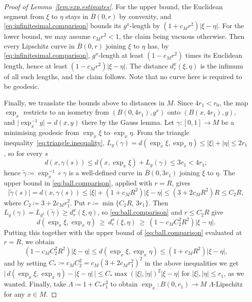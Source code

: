 \documentclass[11pt,reqno]{amsart}
\theoremstyle{plain}
\theoremstyle{definition}
\begin{document}
\begin{proof}[Proof of Lemma~\ref{lem:exp.estimates}]
    For the upper bound, the Euclidean segment from \( \xi \) to \( \eta \) stays in \( \overline B(0,r) \) by convexity, and \eqref{eq:infinitesimal.comparison} bounds its \( g^x \)-length by \( (1+c_Mr^2)\lvert\xi-\eta\rvert \). 
    For the lower bound, we may assume \( c_Mr^2<1 \), the claim being vacuous otherwise.
    Then every Lipschitz curve in \( \overline B(0,r) \) joining \( \xi \) to \( \eta \) has, by \eqref{eq:infinitesimal.comparison}, \( g^x \)-length at least \( (1-c_Mr^2) \) times its Euclidean length, hence at least \( (1-c_Mr^2)\lvert\xi-\eta\rvert \).
    The distance \(d^x_r(\xi,\eta)\) is the infimum of all such lengths, and the claim follows.  
    Note that no curve here is required to be geodesic.
 
    Finally, we translate the bounds above to distances in \(M\).
    Since \( 4r_1<r_0 \), the map \( \exp_x \) restricts to an isometry from \( \left(B(0,4r_1),g^x\right) \) onto \( \left(B(x,4r_1),g\right) \), and \( \lvert\exp_x^{-1}y\rvert=d(x,y) \) there by the Gauss lemma.
    Let \( \gamma:[0,1]\to M \) be a minimising geodesic from \( \exp_x\xi \) to \( \exp_x\eta \).    
    From the triangle inequality~\eqref{eq:triangle.inequality}, \( L_g(\gamma)=d(\exp_x\xi,\exp_x\eta)\le\lvert\xi\rvert+\lvert\eta\rvert\le2r_1 \), so for every \( s \)
    \[
        d\left(x,\gamma(s)\right)\le d(x,\exp_x\xi)+L_g(\gamma)\le3r_1<4r_1 ;
    \]
    hence \( \widetilde\gamma\coloneqq \exp_x^{-1}\circ\,\gamma \) is a well-defined curve in \( \overline B(0,3r_1) \) joining \( \xi \) to \( \eta \).  
    The upper bound in \eqref{eq:ball.comparison}, applied with \( r=R \), gives
    \[
        \lvert\widetilde\gamma(s)\rvert=d\left(x,\gamma(s)\right)
        \le\lvert\xi\rvert+\left(1+c_MR^2\right)\lvert\xi-\eta\rvert
        \le\left(3+2c_MR^2\right)R\le C_2R,
    \]
    where \( C_2\coloneqq 3+2c_Mr_1^2 \).
    Put \( r\coloneqq \min\{C_2R,\,3r_1\} \).  
    Then \( L_g(\gamma) = L_{g^x}(\widetilde\gamma) \ge d^x_r(\xi,\eta) \), so \eqref{eq:ball.comparison} and \( r\le C_2R \) give
    \[
        d(\exp_x\xi,\exp_x\eta)\ \ge\ d^x_r(\xi,\eta)
        \ \ge\ \left(1-c_MC_2^2R^2\right)\lvert\xi-\eta\rvert .
    \]
    Putting this together with the upper bound of \eqref{eq:ball.comparison} evaluated at \( r=R \), we obtain
    \[
        \left(1-c_MC_2^2R^2\right)\lvert\xi-\eta\rvert \le d(\exp_x\xi,\exp_x\eta)\le (1+c_MR^2)\lvert\xi-\eta\rvert,
    \]  
    and by setting \( C_\ast\coloneqq c_MC_2^2=c_M(3+2c_Mr_1^2)^2 \) in the above inequalities we get \( \big\lvert\,d(\exp_x\xi,\exp_x\eta)-\lvert\xi-\eta\rvert\,\big\rvert \le C_\ast\max(\lvert\xi\rvert,\lvert\eta\rvert)^2\lvert\xi-\eta\rvert \) for \(\lvert \xi \rvert, \lvert \eta\rvert \le r_1\), as we wanted.
    Finally, take \(\Lambda\coloneqq 1+C_\ast r_1^2\) to obtain \(\exp_x: B(0, r_1) \to M\) \(\Lambda\)-Lipschitz for any \(x\in M\).
\end{proof}
\end{document}
